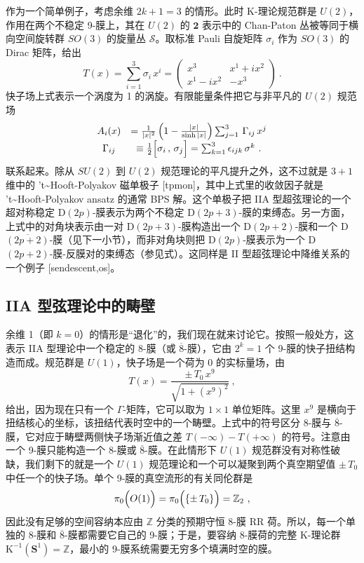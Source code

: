 \documentclass[11pt,a4paper]{ctexart}
\newcommand{\SrcRange}[2]{\marginpar{\raggedright\footnotesize 原文 p.#1}}
\begin{document}
作为一个简单例子，考虑余维 \(2k+1=3\) 的情形。此时 K-理论规范群是 \(U(2)\)，作用在两个不稳定 9-膜上，其在 \(U(2)\) 的 \({\mathbf2}\) 表示中的 Chan-Paton 丛被等同于横向空间旋转群 \(SO(3)\) 的旋量丛 \({\mathcal S}\)。取标准 Pauli 自旋矩阵 \(\sigma_i\) 作为 \(SO(3)\) 的 Dirac 矩阵，给出 \[T(x)=\sum_{i=1}^3\sigma_i\, x^i =
\left( \begin{array}{cc}x^3 & x^1+ix^2\\ x^1-ix^2&-x^3
\end{array}\right)\ .\] 快子场上式表示一个涡度为 1 的涡旋。有限能量条件把它与非平凡的 \(U(2)\) 规范场 \[\begin{matrix}
A_i(x)&=\frac1{|x|^2}\left(1-\frac{|x|}{\sinh|x|}\right)
\sum_{j=1}^3\, \Gamma_{ij}\,x^j\\
\Gamma_{ij}&\equiv\frac{1}{2}\Bigl[\sigma_i\,,\,\sigma_j\Bigr]
=\sum_{k=1}^3\epsilon_{ijk}\,\sigma^k\ .
\end{matrix}\] 联系起来。除从 \(SU(2)\) 到 \(U(2)\) 规范理论的平凡提升之外，这不过就是 \(3+1\) 维中的 't\textasciitilde Hooft-Polyakov 磁单极子 [tpmon]，其中上式里的收敛因子就是 't\textasciitilde Hooft-Polyakov ansatz 的通常 BPS 解。这个单极子把 IIA 型超弦理论的一个超对称稳定 D\((2p)\)-膜表示为两个不稳定 D\((2p+3)\)-膜的束缚态。另一方面，上式中的对角块表示由一对 D\((2p+3)\)-膜构造出一个 D\((2p+2)\)-膜和一个 D\(\overline{(2p+2)}\)-膜（见下一小节），而非对角块则把 D\((2p)\)-膜表示为一个 D\((2p+2)\)-膜-反膜对的束缚态（参见式）。这同样是 II 型超弦理论中降维关系的一个例子 [sendescent,os]。

\SrcRange{50}{50}
\subsection{IIA 型弦理论中的畴壁}\label{iia-ux578bux5f26ux7406ux8bbaux4e2dux7684ux7574ux58c1}

余维 1（即 \(k=0\)）的情形是``退化''的，我们现在就来讨论它。按照一般处方，这表示 IIA 型理论中一个稳定的 8-膜（或 \(\overline{8}\)-膜），它由 \(2^k=1\) 个 9-膜的快子扭结构造而成。规范群是 \(U(1)\)，快子场是一个荷为 0 的实标量场，由 \[T(x)=\frac{\pm\,T_0\,x^9}{\sqrt{1+(x^9)^2}}\ ,\] 给出，因为现在只有一个 \(\Gamma\)-矩阵，它可以取为 \(1\times1\) 单位矩阵。这里 \(x^9\) 是横向于扭结核心的坐标，该扭结代表时空中的一个畴壁。上式中的符号区分 8-膜与 \(\overline{8}\)-膜，它对应于畴壁两侧快子场渐近值之差 \(T(-\infty)-T(+\infty)\) 的符号。注意由一个 9-膜只能构造一个 8-膜或 \(\overline{8}\)-膜。在此情形下 \(U(1)\) 规范群没有对称性破缺，我们剩下的就是一个 \(U(1)\) 规范理论和一个可以凝聚到两个真空期望值 \(\pm\,T_0\) 中任一个的快子场。单个 9-膜的真空流形的有关同伦群是 \[\pi_0\Bigl(O(1)\Bigr)=\pi_0\Bigl(\{ \pm\,T_0\}\Bigr)= {\mathbb{Z}}_2\ ,\] 因此没有足够的空间容纳本应由 \({\mathbb{Z}}\) 分类的预期守恒 8-膜 RR 荷。所以，每一个单独的 8-膜和 \(\overline{8}\)-膜都需要它自己的 9-膜；于是，要容纳 8-膜荷的完整 K-理论群 \({\mathrm K}^{-1}({\mathbf S}^1)= {\mathbb{Z}}\)，最小的 9-膜系统需要无穷多个填满时空的膜。
\end{document}
